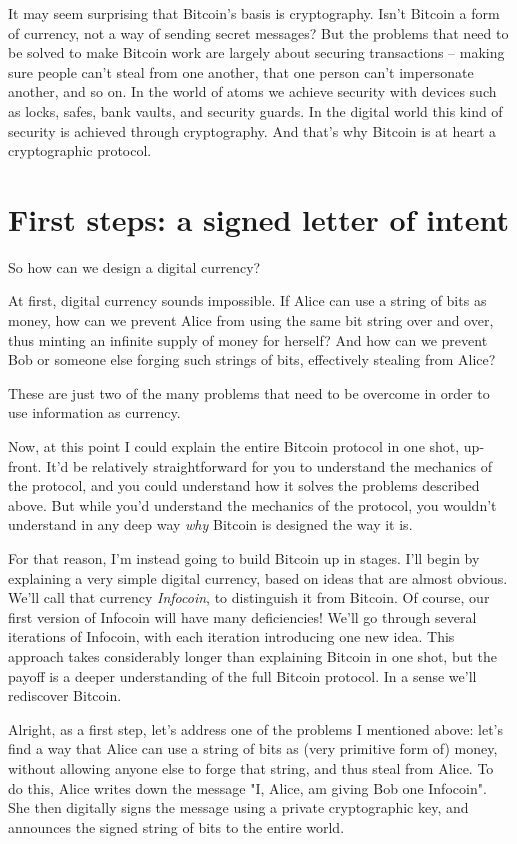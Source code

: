 \documentclass[12pt]{book}
\newcounter{problem}[chapter]
\begin{document}
%
%
It may seem surprising that Bitcoin's basis is cryptography.  Isn't
Bitcoin a form of currency, not a way of sending secret messages?  But
the problems that need to be solved to make Bitcoin work are largely
about securing transactions -- making sure people can't steal from one
another, that one person can't impersonate another, and so on.  In the
world of atoms we achieve security with devices such as locks, safes,
bank vaults, and security guards.  In the digital world this kind of
security is achieved through cryptography.  And that's why Bitcoin is
at heart a cryptographic protocol.

\section{First steps: a signed letter of intent}

So how can we design a digital currency?  

At first, digital currency sounds impossible.  If Alice can use a
string of bits as money, how can we prevent Alice from using the same
bit string over and over, thus minting an infinite supply of money for
herself?  And how can we prevent Bob or someone else forging such
strings of bits, effectively stealing from Alice?

These are just two of the many problems that need to be overcome in
order to use information as currency.

Now, at this point I could explain the entire Bitcoin protocol in one
shot, up-front.  It'd be relatively straightforward for you to
understand the mechanics of the protocol, and you could understand how
it solves the problems described above.  But while you'd understand
the mechanics of the protocol, you wouldn't understand in any deep way
\emph{why} Bitcoin is designed the way it is.

For that reason, I'm instead going to build Bitcoin up in stages.
I'll begin by explaining a very simple digital currency, based on
ideas that are almost obvious.  We'll call that currency
\emph{Infocoin}, to distinguish it from Bitcoin.  Of course, our first
version of Infocoin will have many deficiencies!  We'll go through
several iterations of Infocoin, with each iteration introducing one
new idea.  This approach takes considerably longer than explaining
Bitcoin in one shot, but the payoff is a deeper understanding of the
full Bitcoin protocol.  In a sense we'll rediscover Bitcoin.

Alright, as a first step, let's address one of the problems I
mentioned above: let's find a way that Alice can use a string of bits
as (very primitive form of) money, without allowing anyone else to
forge that string, and thus steal from Alice.  To do this, Alice
writes down the message "I, Alice, am giving Bob one Infocoin".  She
then digitally signs the message using a private cryptographic key,
and announces the signed string of bits to the entire world.
\end{document}
